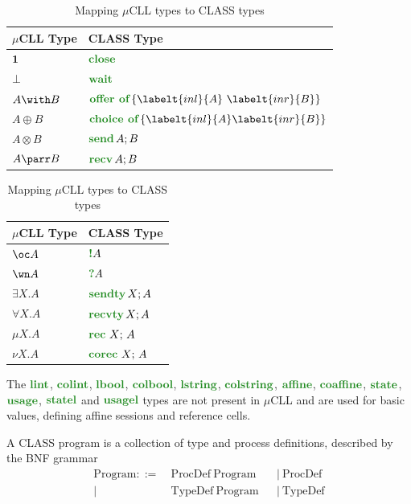 \begin{table}
    \centering
    \caption{Mapping $\mu$CLL types to CLASS types}
    \label{tab:CLASSTypes}
    \begin{tabular}{ll}
        \toprule
        $\mu$CLL Type & CLASS Type                                  \\
        \midrule
        $\mathbf{1}$  & $\closet$                                   \\
        $\bot$        & $\waitt$                                    \\
        $A \with B$   & $\offert{\labelt{inl}{A}\ \labelt{inr}{B}}$ \\
        $A \oplus B$  & $\choicet{\labelt{inl}{A} \labelt{inr}{B}}$ \\
        $A \otimes B$ & $\sendt{A}{B}$                              \\
        $A \parr B$   & $\recvt{A}{B}$                              \\
        \bottomrule
    \end{tabular}
    \hspace{2em}
    \begin{tabular}{ll}
        \toprule
        $\mu$CLL Type & CLASS Type                                  \\
        \midrule
        $\oc A$       & $\bangt{A}$                                 \\
        $\wn A$       & $\whynott{A}$                               \\
        $\exists X.A$ & $\sendtyt{X}{A}$                            \\
        $\forall X.A$ & $\recvtyt{X}{A}$                            \\
        $\mu X.A$     & $\rect{X}{A}$                               \\
        $\nu X.A$     & $\corect{X}{A}$                             \\
        \bottomrule
    \end{tabular}
\end{table}

The $\lintt$, $\colintt$, $\lboolt$, $\colboolt$, $\lstringt$, $\colstringt$, $\classt{affine}$, $\classt{coaffine}$, $\classt{state}$, $\classt{usage}$, $\classt{statel}$ and $\classt{usagel}$ types are not present in $\mu$CLL and are used for basic values, defining affine sessions and reference cells.

A \ac{CLASS} program is a collection of type and process definitions, described by the BNF grammar
\[\begin{aligned}
    \text{Program} ::=\  & \text{ProcDef}\ \text{Program} &  & |\ \text{ProcDef} \\
    |\                   & \text{TypeDef}\ \text{Program} &  & |\ \text{TypeDef}
\end{aligned}\]

